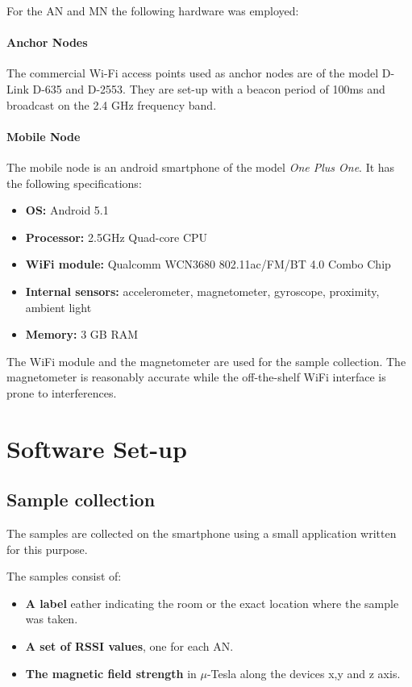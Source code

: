 For the AN and MN the following hardware was employed:

\paragraph{Anchor Nodes}
The commercial Wi-Fi access points used as anchor nodes are of the model D-Link D-635 and D-2553. They are set-up with a beacon period of 100ms and broadcast on the 2.4 GHz frequency band.

\paragraph{Mobile Node}

The mobile node is an android smartphone of the model \emph{One Plus One}. It has the following specifications:

\begin{itemize}
\item \textbf{OS:} Android 5.1
\item \textbf{Processor:} 2.5GHz Quad-core CPU
\item \textbf{WiFi module:} Qualcomm WCN3680 802.11ac/FM/BT 4.0 Combo Chip 
\item \textbf{Internal sensors:} accelerometer, magnetometer, gyroscope, proximity, ambient light
\item \textbf{Memory:} 3 GB RAM
\end{itemize}

The WiFi module and the magnetometer are used for the sample collection. The magnetometer is reasonably accurate while the off-the-shelf WiFi interface is  prone to interferences.


\section{Software Set-up}

\subsection{Sample collection}

The samples are collected on the smartphone using a small application written for this purpose.

The samples consist of:
\begin{itemize}
\item \textbf{A label} eather indicating the room or the exact location where the sample was taken.
\item \textbf{A set of RSSI values}, one for each AN.
\item \textbf{The magnetic field strength} in \(\mu\)-Tesla along the devices x,y and z axis.
\end{itemize}


